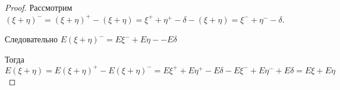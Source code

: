 \begin{enumerate}[label=\protect\circled{\arabic*},series=mean_properties]
\begin{proof}
	  Рассмотрим $(\xi + \eta)^- = (\xi + \eta)^+ - (\xi + \eta) = \xi^+ + \eta^+ - \delta - (\xi + \eta) = \xi^- + \eta^- - \delta$.

	  Следовательно $E(\xi + \eta)^- = E\xi^- + E\eta- - E\delta$

	  Тогда $E(\xi + \eta) = E(\xi + \eta)^+ - E(\xi + \eta)^- = E\xi^+ + E\eta^+ - E\delta- E\xi^- + E\eta^- + E\delta = E\xi + E\eta$

    \end{proof}

\end{enumerate}

